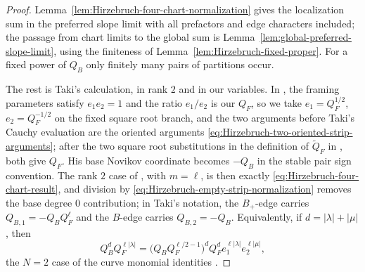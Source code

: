 \documentclass{amsart}
\theoremstyle{definition}
\numberwithin{equation}{section}
\begin{document}
\begin{proof}
Lemma~\ref{lem:Hirzebruch-four-chart-normalization} gives the localization sum in the preferred slope limit with all prefactors and edge characters included; the passage from chart limits to the global sum is Lemma~\ref{lem:global-preferred-slope-limit}, using the finiteness of Lemma~\ref{lem:Hirzebruch-fixed-proper}.  For a fixed power of \(Q_B\) only finitely many pairs of partitions occur.

The rest is Taki's calculation, in rank \(2\) and in our variables.  In \cite[Section~3]{TakiRefined}, the framing parameters satisfy \(e_1e_2=1\) and the ratio \(e_1/e_2\) is our \(Q_F\), so we take \(e_1=Q_F^{1/2}\), \(e_2=Q_F^{-1/2}\) on the fixed square root branch, and the two arguments before Taki's Cauchy evaluation are the oriented arguments \eqref{eq:Hirzebruch-two-oriented-strip-arguments}; after the two square root substitutions in the definition of \(\widetilde Q_F\) in \cite[equation~(3.3)]{TakiRefined}, both give \(Q_F\).  His base Novikov coordinate becomes \(-Q_B\) in the stable pair sign convention.  The rank \(2\) case of \cite[equations~(3.3)--(3.5) and (3.12)--(3.19) in the arXiv version]{TakiRefined}, with \(m=\ell\), is then exactly \eqref{eq:Hirzebruch-four-chart-result}, and division by \eqref{eq:Hirzebruch-empty-strip-normalization} removes the base degree \(0\) contribution; in Taki's notation, the \(B_+\)-edge carries \(Q_{B,1}=-Q_BQ_F^\ell\) and the \(B\)-edge carries \(Q_{B,2}=-Q_B\).  Equivalently, if \(d=|\lambda|+|\mu|\), then
\begin{equation}
 Q_B^dQ_F^{\ell|\lambda|}
 =\bigl(Q_BQ_F^{\ell/2-1}\bigr)^dQ_F^d
   e_1^{\ell|\lambda|}e_2^{\ell|\mu|},
\label{eq:Hirzebruch-Taki-curve-translation}
\end{equation}
the \(N=2\) case of the curve monomial identities \cite[equations~(3.15)--(3.18) in the arXiv version]{TakiRefined}.


\end{proof}
\end{document}
